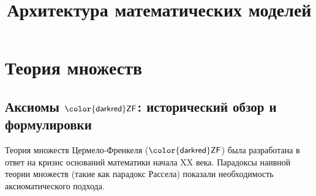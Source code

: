 \documentclass[11pt, a4paper]{extarticle}
\newcommand{\ZF}{\ifmmode \mathsf{\color{darkred}ZF}\else ${\mathsf{\color{darkred}ZF}}$\fi\xspace}
\begin{document}
\title{Архитектура математических моделей}
\maketitle

\tableofcontents

\pagestyle{empty}

\section{Теория множеств}

\subsection{Аксиомы \ZF: исторический обзор и формулировки}

Теория множеств Цермело-Френкеля (\ZF) была разработана в ответ на кризис оснований математики начала XX века. Парадоксы наивной теории множеств (такие как парадокс Рассела) показали необходимость аксиоматического подхода.
\end{document}
